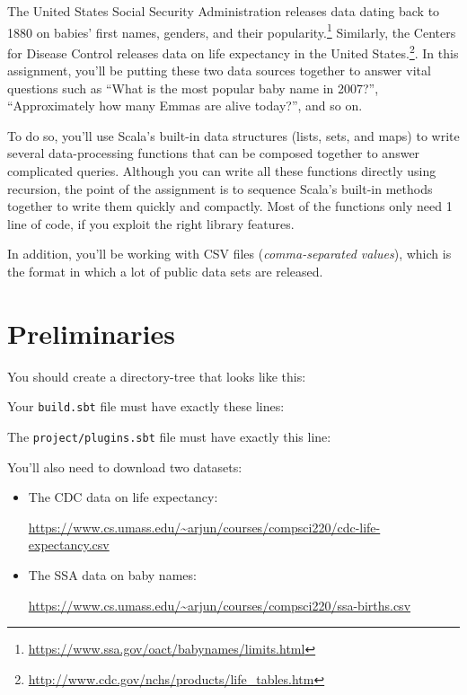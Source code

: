 
The United States Social Security Administration releases data dating back to
1880 on babies' first names, genders, and their
popularity.\footnote{\url{https://www.ssa.gov/oact/babynames/limits.html}}
Similarly, the Centers for Disease Control releases data on life expectancy
in the United States.\footnote{\url{http://www.cdc.gov/nchs/products/life_tables.htm}}.
In this assignment, you'll be putting these two data sources together
to answer vital questions such as ``What is the most popular baby name in 2007?'',
``Approximately how many Emmas are alive today?'', and so on.

To do so, you'll use Scala's built-in data
structures (lists, sets, and maps) to write several data-processing functions
that can be composed together to answer complicated queries.
Although you can write all these functions directly using recursion,
the point of the assignment is to sequence Scala's built-in methods together
to write them quickly and compactly. Most of the functions only need
1 line of code, if you exploit the right library features.

In addition, you'll be working with CSV files (\emph{comma-separated values}),
which is the format in which a lot of public data sets are released.

\section{Preliminaries}

You should create a directory-tree that looks like this:


Your \texttt{build.sbt} file must have exactly these lines:


The \texttt{project/plugins.sbt} file must have exactly this line:


You'll also need to download two datasets:
%
\begin{itemize}

  \item The CDC data on life expectancy:

  \url{https://www.cs.umass.edu/~arjun/courses/compsci220/cdc-life-expectancy.csv}

  \item The SSA data on baby names:

  \url{https://www.cs.umass.edu/~arjun/courses/compsci220/ssa-births.csv}

\end{itemize}

